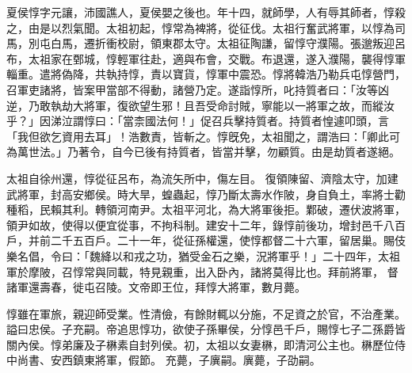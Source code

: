\begin{pinyinscope}
 
 
 夏侯惇字元讓，沛國譙人，夏侯嬰之後也。年十四，就師學，人有辱其師者，惇殺之，由是以烈氣聞。太祖初起，惇常為裨將，從征伐。太祖行奮武將軍，以惇為司馬，別屯白馬，遷折衝校尉，領東郡太守。太祖征陶謙，留惇守濮陽。張邈叛迎呂布，太祖家在鄄城，惇輕軍往赴，適與布會，交戰。布退還，遂入濮陽，襲得惇軍輜重。遣將偽降，共執持惇，責以寶貨，惇軍中震恐。惇將韓浩乃勒兵屯惇營門，召軍吏諸將，皆案甲當部不得動，諸營乃定。遂詣惇所，叱持質者曰：「汝等凶逆，乃敢執劫大將軍，復欲望生邪！且吾受命討賊，寧能以一將軍之故，而縱汝乎？」因涕泣謂惇曰：「當柰國法何！」促召兵擊持質者。持質者惶遽叩頭，言「我但欲乞資用去耳」！浩數責，皆斬之。惇旣免，太祖聞之，謂浩曰：「卿此可為萬世法。」乃著令，自今已後有持質者，皆當并擊，勿顧質。由是劫質者遂絕。
 
 
 
 
太祖自徐州還，惇從征呂布，為流矢所中，傷左目。
 復領陳留、濟陰太守，加建武將軍，封高安鄉侯。時大旱，蝗蟲起，惇乃斷太壽水作陂，身自負土，率將士勸種稻，民賴其利。轉領河南尹。太祖平河北，為大將軍後拒。鄴破，遷伏波將軍，領尹如故，使得以便宜從事，不拘科制。建安十二年，錄惇前後功，增封邑千八百戶，并前二千五百戶。二十一年，從征孫權還，使惇都督二十六軍，留居巢。賜伎樂名倡，令曰：「魏絳以和戎之功，猶受金石之樂，況將軍乎！」二十四年，太祖軍於摩陂，召惇常與同載，特見親重，出入卧內，諸將莫得比也。拜前將軍，
 督諸軍還壽春，徙屯召陵。文帝即王位，拜惇大將軍，數月薨。
 
 
惇雖在軍旅，親迎師受業。性清儉，有餘財輒以分施，不足資之於官，不治產業。謚曰忠侯。子充嗣。帝追思惇功，欲使子孫畢侯，分惇邑千戶，賜惇七子二孫爵皆關內侯。惇弟廉及子楙素自封列侯。初，太祖以女妻楙，即清河公主也。楙歷位侍中尚書、安西鎮東將軍，假節。
 充薨，子廙嗣。廙薨，子劭嗣。
 

\end{pinyinscope}
